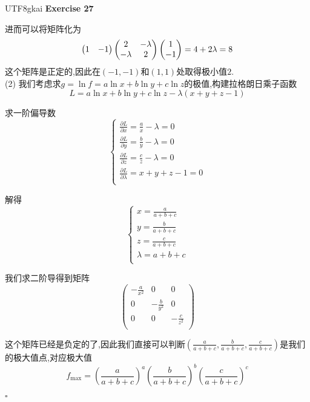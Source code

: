 \documentclass[11pt,hyperref,a4paper,UTF8]{ctexart}
\newenvironment{exercise}[1]{%
{\textbf{Exercise #1} \\ 
    }
}{
  \hfill $\square$ 
  \par\bigskip 
}
\newcommand{\parameter}[1]{\left(#1\right)}
\begin{document}
\begin{CJK}{UTF8}{gkai}
\begin{exercise}{27}
    进而可以将矩阵化为
    \[
    \begin{pmatrix}
        1&-1\\
    \end{pmatrix}
    \begin{pmatrix}
        2&-\lambda\\
        -\lambda&2\\
    \end{pmatrix}
    \begin{pmatrix}
        1\\
        -1\\
    \end{pmatrix}
    =
    4 + 2\lambda = 8\\
    \]
    这个矩阵是正定的,因此在$(-1,-1)$和$(1,1)$处取得极小值$2$.\\

    (2)
    我们考虑求$g = \ln f = a \ln x + b \ln y + c \ln z$的极值,构建拉格朗日乘子函数
    \[L = a \ln x + b \ln y + c \ln z - \lambda(x + y + z - 1)\]

    求一阶偏导数
    \[\begin{cases}
        \frac{\partial L}{\partial x} = \frac{a}{x} - \lambda = 0\\
        \frac{\partial L}{\partial y} = \frac{b}{y} - \lambda = 0\\
        \frac{\partial L}{\partial z} = \frac{c}{z} - \lambda = 0\\
        \frac{\partial L}{\partial \lambda} = x + y + z - 1 = 0\\
    \end{cases}\]

    解得
    \[\begin{cases}
        x = \frac{a}{a + b + c}\\
        y = \frac{b}{a + b + c}\\
        z = \frac{c}{a + b + c}\\
        \lambda = a + b + c\\
    \end{cases}\]

    我们求二阶导得到矩阵
    \[\begin{pmatrix}
        -\frac{a}{x^2}&0&0\\
        0&-\frac{b}{y^2}&0\\
        0&0&-\frac{c}{z^2}\\
    \end{pmatrix}\]

    这个矩阵已经是负定的了,因此我们直接可以判断$(\frac{a}{a + b + c},\frac{b}{a + b + c},\frac{c}{a + b + c})$是我们的极大值点,对应极大值
    \[f_{\max} = \parameter{\frac{a}{a + b + c}}^a \parameter{\frac{b}{a + b + c}}^b \parameter{\frac{c}{a + b + c}}^c\]


\end{exercise}
\end{CJK}
\end{document}
